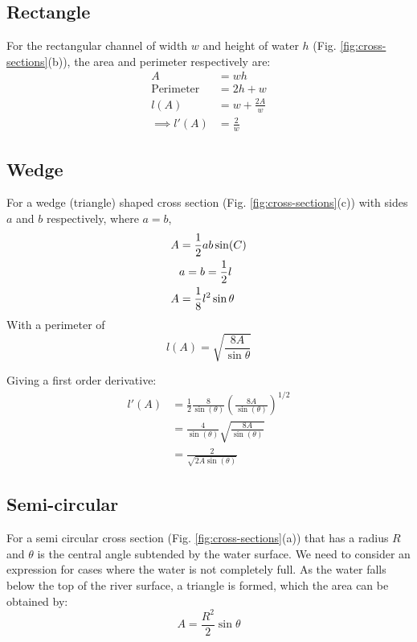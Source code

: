 \documentclass[12pt]{article}
\begin{document}
\subsection{Rectangle}
\label{appendix:rectangle}
For the rectangular channel of width $w$ and height of water $h$ (Fig. \ref{fig:cross-sections}(b)), the area and perimeter respectively are:
\begin{equation}
    \begin{split}
        A &= wh
        \\\text{Perimeter}&=2h + w
        \\l(A) &= w + \frac{2A}{w}
        \\\implies l'(A) &= \frac{2}{w}
    \end{split}
\end{equation}

\subsection{Wedge}
\label{appendix:wedge}
For a wedge (triangle) shaped cross section (Fig. \ref{fig:cross-sections}(c)) with sides $a$ and $b$ respectively, where $a = b$,
\begin{align}
    A &= \frac{1}{2}ab\sin(C) \notag
    \\&a = b = \frac{1}{2}l \notag
    \\A &= \frac{1}{8}l^2\sin{\theta}
\end{align}
With a perimeter of 
\begin{equation}
    l(A) = \sqrt{\frac{8A}{\sin{\theta}}}
\end{equation}

Giving a first order derivative:
\begin{equation}
    \begin{split}
          l'(A) &= \frac{1}{2}\frac{8}{\sin(\theta)}\left(\frac{8A}{\sin(\theta)}\right)^{1/2}
          \\&=\frac{4}{\sin(\theta)}\sqrt{\frac{8A}{\sin(\theta)}}
          \\&=\frac{2}{\sqrt{2A\sin(\theta)}}
    \end{split}
\end{equation}

\subsection{Semi-circular}
\label{appendix:semi-circular}
For a semi circular cross section (Fig. \ref{fig:cross-sections}(a)) that has a radius $R$ and $\theta$ is the central angle subtended by the water surface. We need to consider an expression for cases where the water is not completely full. As the water falls below the top of the river surface, a triangle is formed, which the area can be obtained by:
\begin{equation}
    A = \frac{R^2}{2} \sin\theta
\end{equation}
\end{document}
